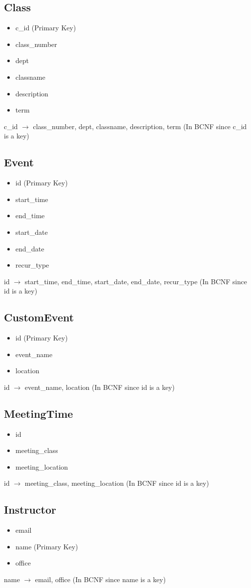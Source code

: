 \documentclass[pdftex,12pt,letter]{article}
\begin{document}
\subsection*{Class}
\begin{itemize}
\item c\_id (Primary Key)
\item class\_number
\item dept
\item classname
\item description
\item term
\end{itemize}
c\_id $\rightarrow$ class\_number, dept, classname, description, term (In BCNF since c\_id is a key)
\subsection*{Event}
\begin{itemize}
\item id (Primary Key)
\item start\_time
\item end\_time
\item start\_date
\item end\_date
\item recur\_type
\end{itemize}
id $\rightarrow$ start\_time, end\_time, start\_date, end\_date, recur\_type (In BCNF since id is a key)
\subsection*{CustomEvent}
\begin{itemize}
\item id (Primary Key)
\item event\_name
\item location
\end{itemize}
id $\rightarrow$ event\_name, location (In BCNF since id is a key)
\subsection*{MeetingTime}
\begin{itemize}
\item id
\item meeting\_class
\item meeting\_location
\end{itemize}
id $\rightarrow$ meeting\_class, meeting\_location (In BCNF since id is a key)
\subsection*{Instructor}
\begin{itemize}
\item email
\item name (Primary Key)
\item office
\end{itemize}
name $\rightarrow$ email, office (In BCNF since name is a key)
\end{document}
